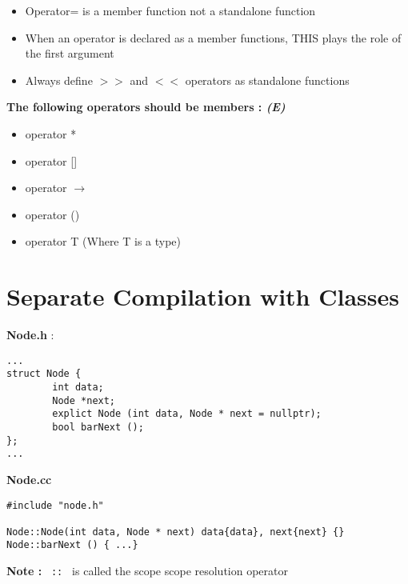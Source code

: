 \documentclass{article}
\newenvironment{ablock}[1]{%
    \tcolorbox[beamer,%
    noparskip,breakable,
    colback=lightcoral,colframe=darkred,%
    colbacklower=tomato!75!lightcoral,%
    title=#1]}%
    {\endtcolorbox}
\begin{document}
\begin{ablock}{Note}
\begin{itemize}
\item Operator= is a member function not a standalone function 
\item When an operator is declared as a member functions, THIS plays the role of the first argument
\item Always define \(>>\) and \(<<\) operators as standalone functions 
\end{itemize}

\textbf{The following operators should be members : \textit{(E)}}
\begin{itemize}
\item operator *
\item operator []
\item operator \(\rightarrow\)
\item operator ()
\item operator T (Where T is a type)
\end{itemize}
\end{ablock}


\section{Separate Compilation with Classes}
\textbf{Node.h} : 

\begin{lstlisting}
...
struct Node {
		int data;
		Node *next;
		explict Node (int data, Node * next = nullptr);
		bool barNext ();
};
...
\end{lstlisting}

\textbf{Node.cc}
\begin{lstlisting}
#include "node.h"

Node::Node(int data, Node * next) data{data}, next{next} {}
Node::barNext () { ...}
\end{lstlisting}


\textbf{Note : }\verb| :: | is called the scope scope resolution operator 
\end{document}
